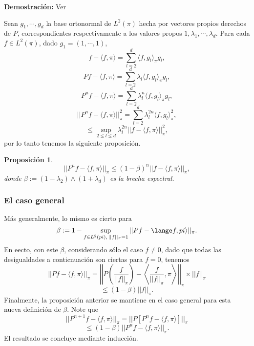 \documentclass[a4paper]{article}
\newtheorem{prop}{Proposici\'on}
\numberwithin{equation}{subsection}
\numberwithin{definicion}{subsection}
\begin{document}
\textbf{Demostración: }Ver \cite[Pag. 41]{Pard}\\ \newline

Sean $g_1, \cdots, g_d$ la base ortonormal de $L^2(\pi)$ hecha por vectores propios derechos de $P$, correspondientes respectivamente a los valores propos $1,\lambda_1,\cdots, \lambda_d$. Para cada $f\in L^2(\pi)$, dado $g_1 = (1,\cdots,1)$,
\[f-\langle f,\pi \rangle = \sum_{l=2}^d \langle f,g_l \rangle_{\pi}g_l,\]
\[Pf - \langle f,\pi \rangle = \sum_{l=2}^d \lambda_l \langle f,g_l \rangle_{\pi}g_l,\]
\[P^nf - \langle f,\pi \rangle = \sum_{l=2}^d \lambda_l^n \langle f,g_l \rangle_{\pi}g_l,\]
\[|| P^nf -\langle f,\pi \rangle||_{\pi}^2 = \sum_{l=2}^d \lambda_l^{2n}\langle f,g_l\rangle_{\pi}^2,\]
\[\leq \sup_{2\leq l\leq d}\lambda_{l}^{2n}||f-\langle f,\pi \rangle ||_{\pi}^2,\]
por lo tanto tenemos la siguiente proposición.
\begin{prop}
\[||P^nf - \langle f,\pi \rangle ||_{\pi} \leq (1-\beta)^n ||f-\langle f,\pi \rangle ||_{\pi},\]
donde $\beta := (1-\lambda_2)\wedge (1+\lambda_d)$ es la brecha espectral.
\end{prop}

\subsubsection{El caso general}
Más generalmente, lo mismo es cierto para
\[\beta := 1 - \sup_{f\in L^2(pi),\,||f||_{\pi} = 1} ||Pf - \lange f,pi \rangle||_{\pi}.\]
En eecto, con este $\beta$, considerando sólo el caso $f\neq 0$, dado que todas las desigualdades a conticnuación son ciertas para $f=0$, tenemos
\[||Pf -\langle f,\pi \rangle ||_{\pi} = \left|\left| P \left(\frac{f}{||f||_\pi}\right) - \left\langle \frac{f}{||f||_{\pi}},\pi\right\rangle \right|\right|_{\pi} \times ||f||_{\pi}\]
\[\leq (1-\beta)||f||_{\pi}.\]
Finalmente, la proposición anterior se mantiene en el caso general para esta nueva definición de $\beta$. Note que
\[||P^{n+1}f - \langle f,\pi \rangle||_{\pi} = ||P[P^nf - \langle f,\pi \rangle]||_{\pi}\]
\[\leq (1-\beta)||P^nf- \langle f,\pi \rangle||_{\pi}.\]
El resultado se concluye mediante inducción.
\end{document}
